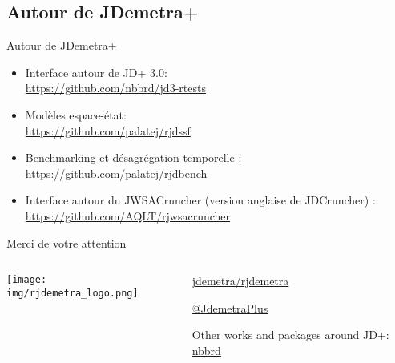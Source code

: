 \documentclass[10pt,xcolor=table,color={dvipsnames,usenames},ignorenonframetext,usepdftitle=false,french]{beamer}
\providecommand{\tightlist}{%
  \setlength{\parskip}{0pt}
  }
\begin{document}
\hypertarget{autour-de-jdemetra}{%
\subsection{Autour de JDemetra+}\label{autour-de-jdemetra}}

\begin{frame}{Autour de JDemetra+}
\protect\hypertarget{autour-de-jdemetra-1}{}

\begin{itemize}
\tightlist
\item
  Interface autour de JD+ 3.0:\\
  \faGithub{} \url{https://github.com/nbbrd/jd3-rtests}
\end{itemize}

\medskip

\begin{itemize}
\tightlist
\item
  Modèles espace-état:\\
  \faGithub{} \url{https://github.com/palatej/rjdssf}
\end{itemize}

\medskip

\begin{itemize}
\tightlist
\item
  Benchmarking et désagrégation temporelle :\\
  \faGithub{} \url{https://github.com/palatej/rjdbench}
\end{itemize}

\medskip

\begin{itemize}
\tightlist
\item
  Interface autour du JWSACruncher (version anglaise de JDCruncher) :\\
  \faGithub{} \url{https://github.com/AQLT/rjwsacruncher}
\end{itemize}

\end{frame}

\begin{frame}{Merci de votre attention}
\protect\hypertarget{merci-de-votre-attention}{}

\vspace{-0.2cm}

\begin{columns}
\begin{column}{0.4\textwidth}
\begin{center}
\texttt{[image: img/rjdemetra\_logo.png]}
\end{center}
\end{column}
\begin{column}{0.5\textwidth} 
\href{https://github.com/jdemetra/rjdemetra}{\faGithub{} jdemetra/rjdemetra}  

\href{https://twitter.com/JDemetraPlus}{\faTwitter{} @JdemetraPlus}

Other works and packages around JD+:  
\href{https://github.com/nbbrd}{\faGithub{} nbbrd}  
\end{column}
\end{columns}

\end{frame}
\end{document}
